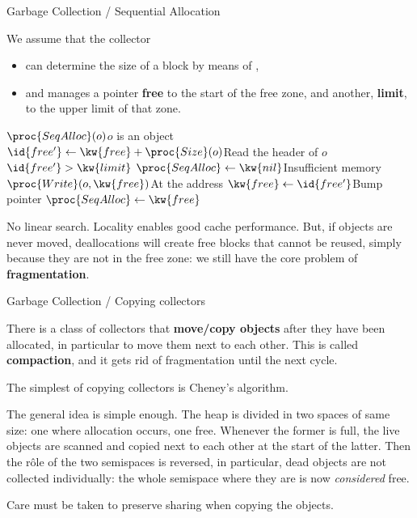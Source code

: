 \documentclass[compress,dvipdfmx]{beamer}
\begin{document}
%
\begin{frame}{Garbage Collection / Sequential Allocation}

  We assume that the collector
  \begin{itemize}

    \item can determine the size of a block by means of ,

    \item and manages a pointer \textbf{free} to the start of the free
      zone, and another, \textbf{limit}, to the upper limit of that
      zone.

  \end{itemize}
  \begin{codebox}
    \(\proc{SeqAlloc}(o)\)\RComment \(o\) is an object\\
    \li \(\id{free'} \gets \kw{free} + \proc{Size}(o)\)\RComment Read
    the header of \(o\)
    \li \If \(\id{free'} > \kw{limit}\)
    \li \Then \(\proc{SeqAlloc} \gets \kw{nil}\)\RComment Insufficient memory
    \li \Else \(\proc{Write}(o, \kw{free})\)\RComment At the address 
    \li       \(\kw{free} \gets \id{free'}\)\RComment Bump pointer
    \li       \(\proc{SeqAlloc} \gets \kw{free}\)
        \End
  \end{codebox}
  No linear search. Locality enables good cache performance. But, if
  objects are never moved, deallocations will create free blocks that
  cannot be reused, simply because they are not in the free zone: we
  still have the core problem of \textbf{fragmentation}.

\end{frame}

%
\begin{frame}{Garbage Collection / Copying collectors}

  There is a class of collectors that \textbf{move/copy objects} after
  they have been allocated, in particular to move them next to each
  other. This is called \textbf{compaction}, and it gets rid of
  fragmentation until the next cycle.

  \bigskip

  The simplest of copying collectors is Cheney's algorithm.

  \bigskip

  The general idea is simple enough. The heap is divided in two spaces
  of same size: one where allocation occurs, one free. Whenever the
  former is full, the live objects are scanned and copied next to each
  other at the start of the latter. Then the rôle of the two
  semispaces is reversed, in particular, dead objects are not
  collected individually: the whole semispace where they are is now
  \emph{considered} free.

  \bigskip

  Care must be taken to preserve sharing when copying the objects.

\end{frame}
\end{document}
